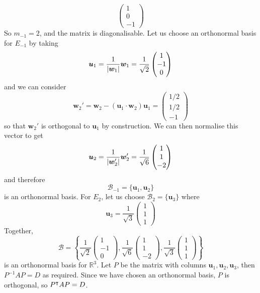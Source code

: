\documentclass{article}
\begin{document}
\begin{enumerate}[(i)]
\[\begin{pmatrix}
			      1 \\ 0 \\ -1
		      \end{pmatrix} \]
	      So $m_{-1} = 2$, and the matrix is diagonalisable. Let us choose an orthonormal basis for $E_{-1}$ by taking
	      \[ \bm u_1 = \frac{1}{\abs{\bm w_1}}\bm w_1 = \frac{1}{\sqrt 2}\begin{pmatrix}
			      1 \\ -1 \\ 0
		      \end{pmatrix} \]
	      and we can consider
	      \[ \bm w_2' = \bm w_2 - (\bm u_1 \cdot \bm w_2)\bm u_1 = \begin{pmatrix}
			      1/2 \\ 1/2 \\ -1
		      \end{pmatrix} \]
	      so that $\bm w_2'$ is orthogonal to $\bm u_1$ by construction. We can then normalise this vector to get
	      \[ \bm u_2 = \frac{1}{\abs{\bm w_2'}}\bm w_2' = \frac{1}{\sqrt 6} \begin{pmatrix}
			      1 \\ 1 \\ -2
		      \end{pmatrix} \]
	      and therefore
	      \[ \mathcal B_{-1} = \{ \bm u_1, \bm u_2 \} \]
	      is an orthonormal basis. For $E_2$, let us choose $\mathcal B_2 = \{ \bm u_3 \}$ where
	      \[ \bm u_3 = \frac{1}{\sqrt 3}\begin{pmatrix}
			      1 \\ 1 \\ 1
		      \end{pmatrix} \]
	      Together,
	      \[ \mathcal B = \left\{ \frac{1}{\sqrt 2}\begin{pmatrix}
			      1 \\ -1 \\ 0
		      \end{pmatrix}, \frac{1}{\sqrt 6} \begin{pmatrix}
			      1 \\ 1 \\ -2
		      \end{pmatrix}, \frac{1}{\sqrt 3}\begin{pmatrix}
			      1 \\ 1 \\ 1
		      \end{pmatrix} \right\} \]
	      is an orthonormal basis for $\mathbb R^3$. Let $P$ be the matrix with columns $\bm u_1, \bm u_2, \bm u_3$, then $P^{-1}AP = D$ as required. Since we have chosen an orthonormal basis, $P$ is orthogonal, so $P^\intercal AP = D$.
\end{enumerate}
\end{document}
